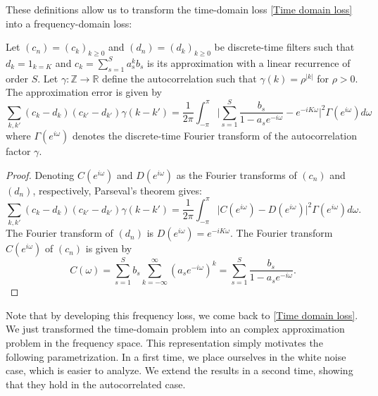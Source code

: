 These definitions allow us to transform the time-domain loss \eqref{Time domain loss} into a frequency-domain loss:

\begin{theorem}\label{theorem frequency loss}
    Let \((c_n)=(c_k)_{k \geq 0}\) and \((d_n)=(d_k)_{k \geq 0}\) be discrete-time filters such that \(d_k=1_{k=K}\) and \(c_k=\sum_{s=1}^Sa_s^kb_s\) is its approximation with a linear recurrence of order \(S\). Let \(\gamma : \mathbb{Z} \to \mathbb{R}\) define the autocorrelation such that \(\gamma(k)=\rho^{\vert k\vert}\) for \(\rho > 0\). The approximation error is given by
\begin{equation}
\sum_{k, k'} (c_k - d_k)(c_{k'} - d_{k'}) \gamma(k - k') = \frac{1}{2\pi} \int_{-\pi}^\pi \bigg\vert\sum_{s=1}^{S}\frac{b_s}{1-a_se^{-i\omega}} - e^{-iK\omega}\bigg\vert^2 \Gamma(e^{i\omega}) d\omega
\label{Frequential loss copy task}
\end{equation}
where \(\Gamma(e^{i\omega})\) denotes the discrete-time Fourier transform of the autocorrelation factor \(\gamma\).
\end{theorem}

\begin{proof}
    Denoting \(C(e^{i\omega})\) and \(D(e^{i\omega})\) as the Fourier transforms of \((c_n)\) and \((d_n)\), respectively, Parseval's theorem gives:
    \[
    \sum_{k, k'} (c_k - d_k)(c_{k'} - d_{k'}) \gamma(k - k') = \frac{1}{2\pi} \int_{-\pi}^\pi \bigg\vert C(e^{i\omega}) - D(e^{i\omega})\bigg\vert^2 \Gamma(e^{i\omega}) d\omega.
    \]
    The Fourier transform of \((d_n)\) is \(D(e^{i\omega})=e^{-iK\omega}\). The Fourier transform \(C(e^{i\omega})\) of \((c_n)\) is given by 
    \[
    C(\omega) = \sum_{s=1}^S b_s \sum_{k=-\infty}^\infty \left(a_s e^{-i\omega}\right)^k = \sum_{s=1}^S \frac{b_s}{1 - a_s e^{-i\omega}}.
    \]
\end{proof}

Note that by developing this frequency loss, we come back to \eqref{Time domain loss}. We just transformed the time-domain problem into an complex approximation problem in the frequency space. This representation simply motivates the following parametrization. In a first time, we place ourselves in the white noise case, which is easier to analyze. We extend the results in a second time, showing that they hold in the autocorrelated case.


